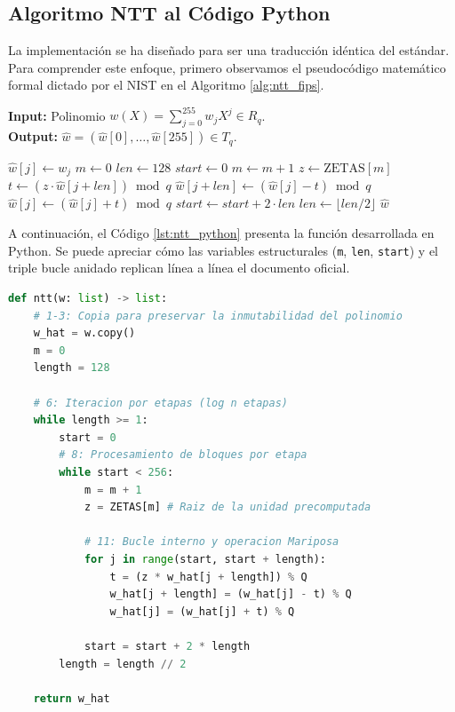 \documentclass[11pt, a4paper]{report}
\theoremstyle{definition}
\begin{document}
\subsection{Algoritmo NTT al Código Python}

La implementación se ha diseñado para ser una traducción idéntica del estándar. Para comprender este enfoque, primero observamos el pseudocódigo matemático formal dictado por el NIST en el Algoritmo \ref{alg:ntt_fips}.

\begin{algorithm}[H]
\caption{NTT($w$) - Algoritmo 41 del estándar FIPS 204}
\label{alg:ntt_fips}
\textbf{Input:} Polinomio $w(X) = \sum_{j=0}^{255} w_j X^j \in R_q$. \\
\textbf{Output:} $\hat{w} = (\hat{w}[0], \dots, \hat{w}[255]) \in T_q$.
\begin{algorithmic}[1]
    \STATE $\hat{w}[j] \gets w_j$
\ENDFOR
\STATE $m \gets 0$
\STATE $len \gets 128$
    \STATE $start \gets 0$
        \STATE $m \gets m + 1$
        \STATE $z \gets \text{ZETAS}[m]$ 
            \STATE $t \gets (z \cdot \hat{w}[j + len]) \bmod q$
            \STATE $\hat{w}[j + len] \gets (\hat{w}[j] - t) \bmod q$
            \STATE $\hat{w}[j] \gets (\hat{w}[j] + t) \bmod q$
        \ENDFOR
        \STATE $start \gets start + 2 \cdot len$
    \ENDWHILE
    \STATE $len \gets \lfloor len / 2 \rfloor$
\ENDWHILE
\RETURN $\hat{w}$
\end{algorithmic}
\end{algorithm}

A continuación, el Código \ref{lst:ntt_python} presenta la función desarrollada en Python. Se puede apreciar cómo las variables estructurales (\texttt{m}, \texttt{len}, \texttt{start}) y el triple bucle anidado replican línea a línea el documento oficial.

\begin{minipage}{\linewidth}
\begin{lstlisting}[language=Python, caption={Implementación de la NTT reflejando el Algoritmo 41 de FIPS 204.}, label={lst:ntt_python}]
def ntt(w: list) -> list:
    # 1-3: Copia para preservar la inmutabilidad del polinomio
    w_hat = w.copy()
    m = 0
    length = 128
    
    # 6: Iteracion por etapas (log n etapas)
    while length >= 1:
        start = 0
        # 8: Procesamiento de bloques por etapa
        while start < 256:
            m = m + 1
            z = ZETAS[m] # Raiz de la unidad precomputada
            
            # 11: Bucle interno y operacion Mariposa
            for j in range(start, start + length):
                t = (z * w_hat[j + length]) % Q
                w_hat[j + length] = (w_hat[j] - t) % Q
                w_hat[j] = (w_hat[j] + t) % Q
                
            start = start + 2 * length
        length = length // 2
        
    return w_hat
\end{lstlisting}
\end{minipage}
\end{document}
